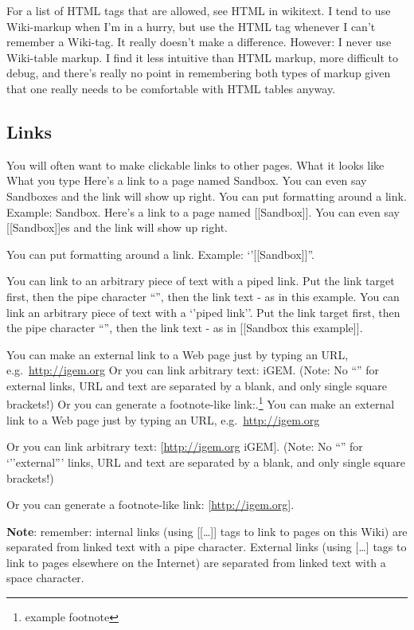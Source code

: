 \documentclass[]{book}
\let\rmarkdownfootnote\footnote%
\def\footnote{\protect\rmarkdownfootnote}
\begin{document}
For a list of HTML tags that are allowed, see HTML in wikitext. I tend
to use Wiki-markup when I'm in a hurry, but use the HTML tag whenever I
can't remember a Wiki-tag. It really doesn't make a difference. However:
I never use Wiki-table markup. I find it less intuitive than HTML
markup, more difficult to debug, and there's really no point in
remembering both types of markup given that one really needs to be
comfortable with HTML tables anyway.

\subsection{Links}\label{links}

You will often want to make clickable links to other pages. What it
looks like What you type Here's a link to a page named Sandbox. You can
even say Sandboxes and the link will show up right. You can put
formatting around a link. Example: Sandbox. Here's a link to a page
named {[}{[}Sandbox{]}{]}. You can even say {[}{[}Sandbox{]}{]}es and
the link will show up right.

You can put formatting around a link. Example: `'{[}{[}Sandbox{]}{]}''.

You can link to an arbitrary piece of text with a piped link. Put the
link target first, then the pipe character ``\textbar{}'', then the link
text - as in this example. You can link an arbitrary piece of text with
a `'piped link''. Put the link target first, then the pipe character
``\textbar{}'', then the link text - as in {[}{[}Sandbox\textbar{} this
example{]}{]}.

You can make an external link to a Web page just by typing an URL,
e.g.~\url{http://igem.org} Or you can link arbitrary text: iGEM. (Note:
No ``\textbar{}'' for external links, URL and text are separated by a
blank, and only single square brackets!) Or you can generate a
footnote-like link:.\footnote{example footnote} You can make an external
link to a Web page just by typing an URL, e.g.~\url{http://igem.org}

Or you can link arbitrary text: {[}\url{http://igem.org} iGEM{]}. (Note:
No ``\textbar{}'' for `''external''' links, URL and text are separated
by a blank, and only single square brackets!)

Or you can generate a footnote-like link: {[}\url{http://igem.org}{]}.

\textbf{Note}: remember: internal links (using {[}{[}\ldots{}{]}{]} tags
to link to pages on this Wiki) are separated from linked text with a
pipe character. External links (using {[}\ldots{}{]} tags to link to
pages elsewhere on the Internet) are separated from linked text with a
space character.
\end{document}
